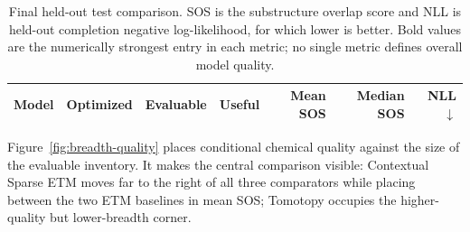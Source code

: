 \documentclass[10pt,a4paper]{article}
\begin{document}
\begin{table}[H]
\centering
\small
\caption{Final held-out test comparison. SOS is the substructure overlap score and NLL
is held-out completion negative log-likelihood, for which lower is better. Bold
values are the numerically strongest entry in each metric; no single metric
defines overall model quality.}
\label{tab:test-comparison}
\begin{tabular}{@{}lrrrrrr@{}}
\toprule
Model & Optimized & Evaluable & Useful & Mean SOS & Median SOS & NLL $\downarrow$ \\
\midrule

\end{tabular}
\end{table}

Figure~\ref{fig:breadth-quality} places conditional chemical quality against
the size of the evaluable inventory. It makes the central comparison visible:
Contextual Sparse ETM moves far to the right of all three comparators while
placing between the two ETM baselines in mean SOS; Tomotopy occupies the
higher-quality but lower-breadth corner.
\end{document}
